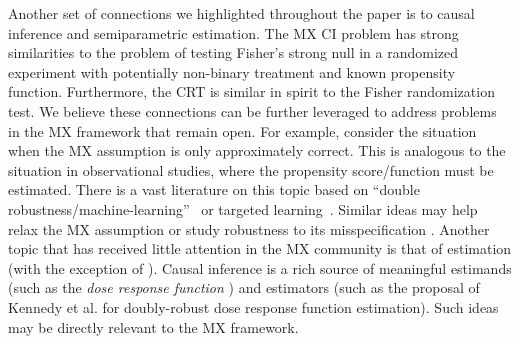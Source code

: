 \documentclass[12pt]{article}
\theoremstyle{definition}
\theoremstyle{remark}
\begin{document}
Another set of connections we highlighted throughout the paper is to causal inference and semiparametric estimation. The MX CI problem has strong similarities to the problem of testing Fisher's strong null in a randomized experiment with potentially non-binary treatment and known propensity function. Furthermore, the CRT is similar in spirit to the Fisher randomization test. We believe these connections can be further leveraged to address problems in the MX framework that remain open. For example, consider the situation when the MX assumption is only approximately correct. This is analogous to the situation in observational studies, where the propensity score/function must be estimated. There is a vast literature on this topic based on ``double robustness/machine-learning''~\cite{Chernozhukov2018} or targeted learning~\cite{VanderLaan2011}. Similar ideas may help relax the MX assumption \cite{Huang2019} or study robustness to its misspecification \cite{Barber2018}. Another topic that has received little attention in the MX community is that of estimation (with the exception of \cite{Zhang2020}). Causal inference is a rich source of meaningful estimands (such as the \textit{dose response function} \cite{Hirano2004}) and estimators (such as the proposal of Kennedy et al. \cite{Kennedy2017} for doubly-robust dose response function estimation). Such ideas may be directly relevant to the MX framework.
\end{document}
